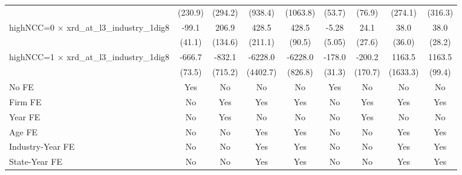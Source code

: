 {\begin{tabular}{l*{8}{c}}
                    &     (230.9)         &     (294.2)         &     (938.4)         &    (1063.8)         &      (53.7)         &      (76.9)         &     (274.1)         &     (316.3)         \\
\addlinespace
highNCC=0 $\times$ xrd\_at\_l3\_industry\_1dig8&       -99.1\sym{**} &       206.9         &       428.5\sym{**} &       428.5\sym{***}&       -5.28         &        24.1         &        38.0         &        38.0         \\
                    &      (41.1)         &     (134.6)         &     (211.1)         &      (90.5)         &      (5.05)         &      (27.6)         &      (36.0)         &      (28.2)         \\
\addlinespace
highNCC=1 $\times$ xrd\_at\_l3\_industry\_1dig8&      -666.7\sym{***}&      -832.1         &     -6228.0         &     -6228.0\sym{***}&      -178.0\sym{***}&      -200.2         &      1163.5         &      1163.5\sym{***}\\
                    &      (73.5)         &     (715.2)         &    (4402.7)         &     (826.8)         &      (31.3)         &     (170.7)         &    (1633.3)         &      (99.4)         \\
\addlinespace
No FE               &         Yes         &          No         &          No         &          No         &         Yes         &          No         &          No         &          No         \\
\addlinespace
Firm FE             &          No         &         Yes         &         Yes         &         Yes         &          No         &         Yes         &         Yes         &         Yes         \\
\addlinespace
Year FE             &          No         &         Yes         &          No         &          No         &          No         &         Yes         &          No         &          No         \\
\addlinespace
Age FE              &          No         &          No         &         Yes         &         Yes         &          No         &          No         &         Yes         &         Yes         \\
\addlinespace
Industry-Year FE    &          No         &          No         &         Yes         &         Yes         &          No         &          No         &         Yes         &         Yes         \\
\addlinespace
State-Year FE       &          No         &          No         &         Yes         &         Yes         &          No         &          No         &         Yes         &         Yes         \\

\end{tabular}}
